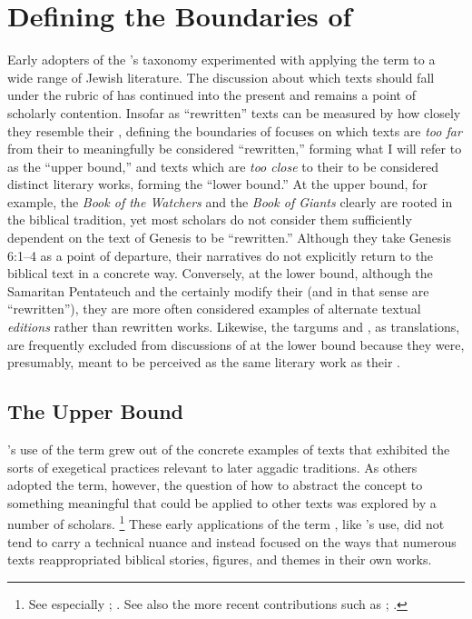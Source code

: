 \section{Defining the Boundaries of \rwb}

Early adopters of the \vermes's taxonomy experimented with applying the term \rwb to a wide range of \secondtemple Jewish literature. The discussion about which texts should fall under the rubric of \rwb has continued into the present and remains a point of scholarly contention. Insofar as ``rewritten'' texts can be measured by how closely they resemble their \vorlagen, defining the boundaries of \rwb focuses on which texts are \emph{too far} from their \vorlagen to meaningfully be considered ``rewritten,'' forming what I will refer to as the ``upper bound,'' and texts which are \emph{too close} to their \vorlagen to be considered distinct literary works, forming the ``lower bound.'' At the upper bound, for example, the \emph{Book of the Watchers} and the \emph{Book of Giants} clearly are rooted in the biblical tradition, yet most scholars do not consider them sufficiently dependent on the text of Genesis to be ``rewritten.'' Although they take Genesis 6:1--4 as a point of departure, their narratives do not explicitly return to the biblical text in a concrete way. Conversely, at the lower bound, although the Samaritan Pentateuch and the  certainly modify their \vorlagen (and in that sense are ``rewritten''), they are more often considered examples of alternate textual \emph{editions} rather than rewritten works. Likewise, the targums and \lxx, as translations, are frequently excluded from discussions of \rwb at the lower bound because they were, presumably, meant to be perceived as the same literary work as their \vorlagen. 

\subsection{The Upper Bound}

\vermes's use of the term \rwb grew out of the concrete examples of texts that exhibited the sorts of exegetical practices relevant to later aggadic traditions. As others adopted the term, however, the question of how to abstract the concept to something meaningful that could be applied to other texts was explored by a number of scholars.%
    \footnote{%
        See especially
        \cite{nickelsburg_stone1984};
        \cite{harrington_kraft-nickelsburg1986}. See also the more recent contributions such as 
        \cite{crawford2008};
        \cite{falk2007}.}
These early applications of the term \rwb, like \vermes's use, did not tend to carry a technical nuance and instead focused on the ways that numerous texts reappropriated biblical stories, figures, and themes in their own works. 

